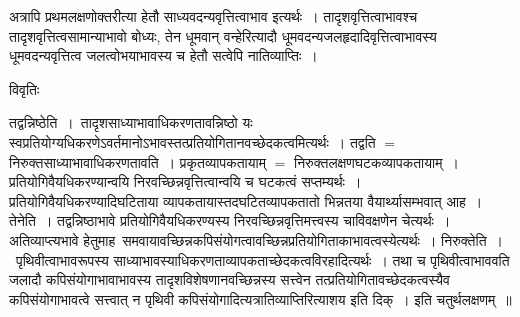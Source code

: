 \documentclass[10pt, openany]{book}
\begin{document}
{{अत्रापि प्रथमलक्षणोक्तरीत्या हेतौ साध्यवदन्यवृत्तित्वाभाव इत्यर्थः~। तादृशवृत्तित्वाभावश्च तादृशवृत्तित्वसामान्याभावो बोध्यः, तेन धूमवान् वन्हेरित्यादौ धूमवदन्यजलहृदादिवृत्तित्वाभावस्य धूमवदन्यवृत्तित्व जलत्वोभयाभावस्य च हेतौ सत्वेपि नातिव्याप्तिः~।}
\begin{center}     विवृतिः \end{center}
{\la तद्वन्निष्ठेति~।}~तादृशसाध्याभावाधिकरणतावन्निष्ठो यः स्वप्रतियोग्यधिकरणेऽवर्तमानोऽभावस्तत्प्रतियोगितानवच्छेदकत्वमित्यर्थः~। तद्वति $=$ निरुक्तसाध्याभावाधिकरणतावति~। प्रकृतव्यापकतायाम् $=$ निरुक्तलक्षणघटकव्यापकतायाम्~। प्रतियोगिवैयधिकरण्यान्वयि निरवच्छिन्नवृत्तित्वान्वयि च घटकत्वं सप्तम्यर्थः~। प्रतियोगिवैयधिकरण्यादिघटिताया व्यापकतायास्तदघटितव्यापकतातो भिन्नतया वैयार्थ्यासम्भवात् आह~। {\la तेनेति~।} तद्वन्निष्ठाभावे प्रतियोगिवैयधिकरण्यस्य निरवच्छिन्नवृत्तिमत्त्वस्य चाविवक्षणेन चेत्यर्थः~। अतिव्याप्त्यभावे हेतुमाह~समवायावच्छिन्नकपिसंयोगत्वावच्छिन्नप्रतियोगिताकाभावत्वस्येत्यर्थः~। {\qt  निरुक्तेति~।}~पृथिवीत्वाभावरूपस्य साध्याभावस्याधिकरणताव्यापकताच्छेदकत्वविरहादित्यर्थः~। तथा च पृथिवीत्वाभाववति जलादौ कपिसंयोगाभावाभावस्य तादृशविशेषणानवच्छिन्नस्य सत्त्वेन तत्प्रतियोगितावच्छेदकत्वस्यैव कपिसंयोगाभावत्वे सत्त्वात् न पृथिवी कपिसंयोगादित्यत्रातिव्याप्तिरित्याशय इति दिक्~। इति चतुर्थलक्षणम्~॥\\

}
\end{document}
